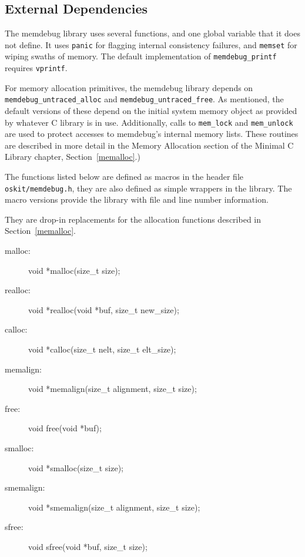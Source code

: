 \subsection{External Dependencies}

The memdebug library uses several functions, and one global variable
that it does not define.  It
uses {\tt panic} for flagging internal consistency failures, and
{\tt memset} for wiping swaths of memory.
The default implementation of {\tt memdebug_printf} requires 
{\tt vprintf}.

For memory allocation primitives, the memdebug library depends 
on {\tt memdebug_untraced_alloc} and {\tt memdebug_untraced_free}.
As mentioned, the default versions of these depend on
the initial system memory object as provided by whatever C library is in use.
Additionally, calls to {\tt mem_lock} and 
{\tt mem_unlock} are used to protect accesses to memdebug's internal
memory lists.
These routines are described in more detail in
the Memory Allocation section of the Minimal C Library chapter,
Section~\ref{memalloc}.) 


The functions listed below are defined as macros in
the header file {\tt oskit/memdebug.h}, they are
also defined as simple wrappers in the library.
The macro versions provide the library with file and
line number information.

They are drop-in replacements for the allocation functions
described in Section~\ref{memalloc}.

\begin{description}
\item[malloc:] \funcproto void *malloc(size_t size);
\item[realloc:] \funcproto void *realloc(void *buf, size_t new_size);
\item[calloc:] \funcproto void *calloc(size_t nelt, size_t elt_size);
\item[memalign:] \funcproto void *memalign(size_t alignment, size_t size);
\item[free:] \funcproto void free(void *buf);
\item[smalloc:] \funcproto void *smalloc(size_t size);
\item[smemalign:] \funcproto void *smemalign(size_t alignment, size_t size);
\item[sfree:] \funcproto void sfree(void *buf, size_t size);
\end{description}

